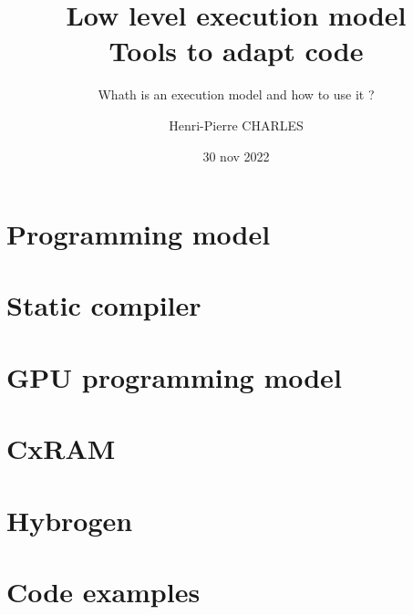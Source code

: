 \documentclass[aspectratio=169,8pt]{beamer}
\institute{CEA DSCIN department / Grenoble}
\title{Low level execution model\\Tools to adapt code}
\subtitle{Whath is an execution model and how to use it ?}
\date{30 nov 2022}
\author{Henri-Pierre CHARLES}
\newcommand{\Slide}[1]{}
\begin{document}
\frame[plain]{\titlepage}
\section{Programming model}
\Slide{CPU/PrincipeAlgoProcesseur}
\Slide{CPU/Encoding}
\Slide{CPU/ARM}
\Slide{CPU/uArch}
\Slide{CPU/CachesHierarchy}
\Slide{CPU/C-Matrix-Multiply-Tiles}

\section{Static compiler}

\Slide{CPU/C}
\Slide{CPU/C2}
\Slide{CPU/GCC}
\Slide{CPU/GCC-Research}
\section{GPU programming model}

\Slide{GPU/CUDA}
\Slide{GPU/CUDA-Example}
\Slide{GPU/ThreadModel}
\Slide{GPU/CompilationChain}

\section{CxRAM}

\Slide{CxRAM/RememberMemory101}
\Slide{CxRAM/RememberMemory102}
\Slide{CxRAM/InvertedVonNeumannModel}
\Slide{CxRAM/InvertedVonNeumann1}
\Slide{CxRAM/BrokenAmdahlLaw}


\section{Hybrogen}

\Slide{HybroGen/InitialObjectives}
\Slide{HybroGen/DomainSpecificLanguage}
\Slide{HybroGen/CompilerVersusCompilette}
\Slide{HybroGen/GeneralView}
\Slide{HybroGen/H2LanguageSpecific}
\Slide{HybroGen/Objectives}
\Slide{HybroGen/Optimization-Phases}
\Slide{HybroGen/Optimization-Target-Specific-Phases}
\Slide{HybroGen/Programmation}

\section{Code examples}

\Slide{HybroGen/Simple-Add-Principle}
\Slide{HybroGen/Simple-Add-Source-H2}
\Slide{HybroGen/Simple-Add-Build}
\Slide{HybroGen/Simple-Add-Generated-Macros}
\Slide{HybroGen/Simple-Add-Generated-Compilette}
\Slide{HybroGen/Simple-Add-Generated-InstructionSelector}
\Slide{HybroGen/Simple-Add-Generated-Main}
\Slide{HybroGen/Simple-Add-Exec}
\Slide{HybroGen/Simple-Add-Source-Main}
\Slide{HybroGen/Simple-Add-Debug}
\end{document}
